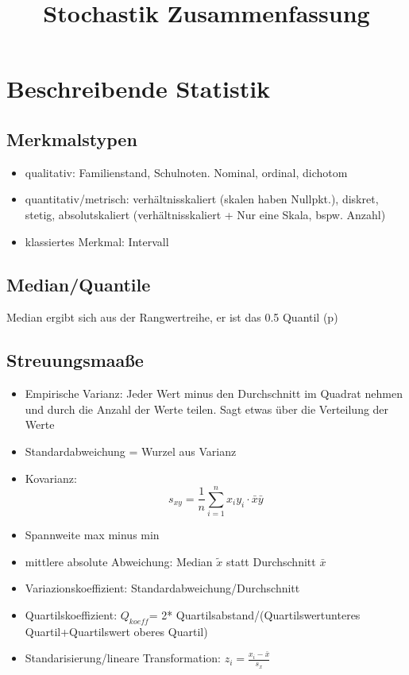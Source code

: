 \documentclass[10pt,a4paper]{article}
\date{\vspace{-5ex}}
\title{Stochastik Zusammenfassung}
\begin{document}
	\maketitle
	\section{Beschreibende Statistik}
	\subsection{Merkmalstypen}
	\begin{itemize}
		\item 	qualitativ: Familienstand, Schulnoten. Nominal, ordinal, dichotom
		\item	quantitativ/metrisch: verhältnisskaliert (skalen haben Nullpkt.), diskret, stetig, absolutskaliert (verhältnisskaliert + Nur eine Skala, bspw. Anzahl)
		\item klassiertes Merkmal: Intervall
	\end{itemize}
	\subsection{Median/Quantile}
	
	Median ergibt sich aus der Rangwertreihe, er ist das 0.5 Quantil (p)
	\subsection{Streuungsmaaße}
	\begin{itemize}
		\item Empirische Varianz: Jeder Wert minus den Durchschnitt im Quadrat nehmen und durch die Anzahl der Werte teilen. Sagt etwas über die Verteilung der Werte
		\item Standardabweichung = Wurzel aus Varianz
		\item Kovarianz: $$s_{xy} = \frac{1}{n}  \sum_{i=1}^{n} x_i y_i \cdot \bar x \bar y$$
		\item Spannweite max minus min
		\item mittlere absolute Abweichung: Median $\tilde{x}$ statt Durchschnitt $\bar{x}$
		\item Variazionskoeffizient: Standardabweichung/Durchschnitt	
		\item Quartilskoeffizient: $Q_{koeff}$= 2* Quartilsabstand/(Quartilswertunteres Quartil+Quartilswert oberes Quartil)
		\item Standarisierung/lineare Transformation: $z_i=\frac{x_i-\bar{x}}{s_x	}$
	\end{itemize}
\end{document}
